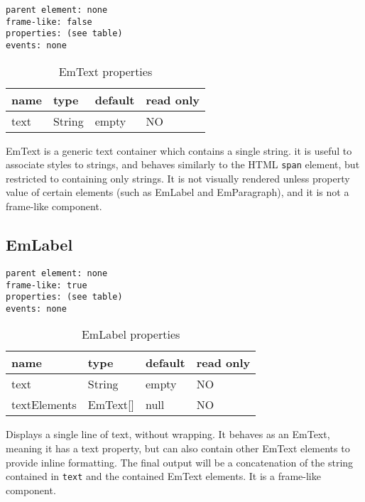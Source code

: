 \begin{verbatim}
parent element: none
frame-like: false
properties: (see table)
events: none
\end{verbatim}

\begin{table}[ht]
\caption{EmText properties}
\centering
\begin{tabular}{l l l l}
\hline\hline
name & type & default & read only \\ [0.5ex]
\hline %
text & String & empty & NO \\ [1ex] %
\hline %
\end{tabular}
\end{table}

EmText is a generic text container which contains a single string. it is useful to associate styles to strings, and behaves similarly to the HTML \texttt{span} element, but restricted to containing only strings. It is not visually rendered unless property value of certain elements (such as EmLabel and EmParagraph), and it is not a frame-like component.

\subsection{EmLabel}

\begin{verbatim}
parent element: none
frame-like: true
properties: (see table)
events: none
\end{verbatim}

\begin{table}[ht]
\caption{EmLabel properties}
\centering
\begin{tabular}{l l l l}
\hline\hline
name & type & default & read only \\ [0.5ex]
\hline %
text & String & empty & NO \\
textElements & EmText[] & null & NO \\ [1ex] %
\hline %
\end{tabular}

\end{table}

Displays a single line of text, without wrapping. It behaves as an EmText, meaning it has a text property, but can also contain other EmText elements to provide inline formatting. The final output will be a concatenation of the string contained in \texttt{text} and the contained EmText elements. It is a frame-like component.

